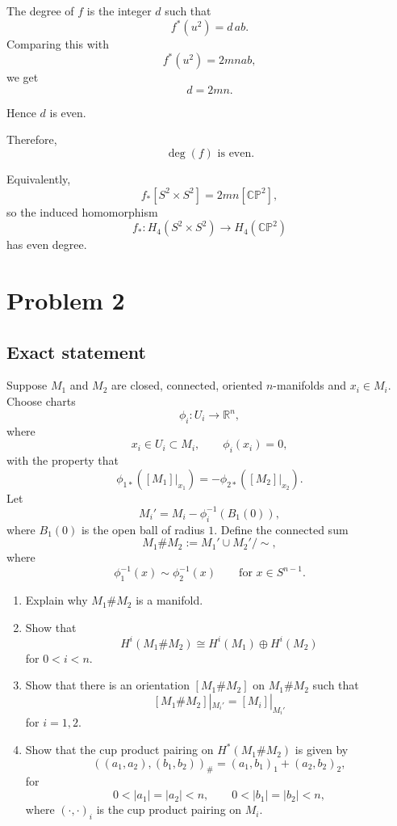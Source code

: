 \documentclass[12pt,a4paper]{article}
\theoremstyle{notespace}
\begin{document}
The degree of \(f\) is the integer \(d\) such that
\[
f^{*}(u^{2})=d\,ab.
\]
Comparing this with
\[
f^{*}(u^{2})=2mnab,
\]
we get
\[
d=2mn.
\]

Hence \(d\) is even.

Therefore,
\[
\boxed{\deg(f)\text{ is even.}}
\]

Equivalently,
\[
f_{*}[S^{2}\times S^{2}]
=
2mn[\mathbb{CP}^{2}],
\]
so the induced homomorphism
\[
f_{*}:H_{4}(S^{2}\times S^{2})
\longrightarrow
H_{4}(\mathbb{CP}^{2})
\]
has even degree.

\section{Problem 2}

\subsection*{Exact statement}

Suppose \(M_{1}\) and \(M_{2}\) are closed, connected, oriented
\(n\)-manifolds and \(x_i\in M_i\). Choose charts
\[
\phi_i:U_i\longrightarrow \mathbb{R}^{n},
\]
where
\[
x_i\in U_i\subset M_i,
\qquad
\phi_i(x_i)=0,
\]
with the property that
\[
\phi_{1*}([M_1]|_{x_1})
=
-\phi_{2*}([M_2]|_{x_2}).
\]
Let
\[
M_i'
=
M_i-\phi_i^{-1}(B_1(0)),
\]
where \(B_1(0)\) is the open ball of radius \(1\). Define the connected sum
\[
M_1\# M_2
:=
M_1'\cup M_2'/\sim,
\]
where
\[
\phi_1^{-1}(x)\sim \phi_2^{-1}(x)
\qquad
\text{for }x\in S^{n-1}.
\]

\begin{enumerate}
	\item[(a)] Explain why \(M_1\# M_2\) is a manifold.
	
	\item[(b)] Show that
	\[
	H^i(M_1\#M_2)
	\cong
	H^i(M_1)\oplus H^i(M_2)
	\]
	for \(0<i<n\).
	
	\item[(c)] Show that there is an orientation \([M_1\#M_2]\) on
	\(M_1\#M_2\) such that
	\[
	[M_1\#M_2]|_{M_i'}
	=
	[M_i]|_{M_i'}
	\]
	for \(i=1,2\).
	
	\item[(d)] Show that the cup product pairing on \(H^*(M_1\#M_2)\)
	is given by
	\[
	((a_1,a_2),(b_1,b_2))_{\#}
	=
	(a_1,b_1)_1+(a_2,b_2)_2,
	\]
	for
	\[
	0<|a_1|=|a_2|<n,
	\qquad
	0<|b_1|=|b_2|<n,
	\]
	where \((\cdot,\cdot)_i\) is the cup product pairing on \(M_i\).
\end{enumerate}
\end{document}

